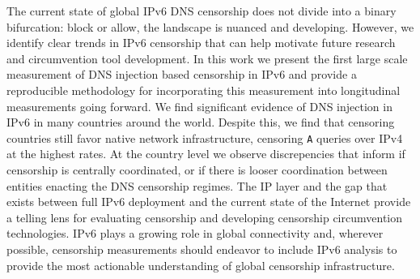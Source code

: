 The current state of global IPv6 DNS censorship does not divide into a binary
bifurcation: block or allow, the landscape is nuanced and developing. However, we
identify clear trends in IPv6 censorship that can help motivate future research
and circumvention tool development.
%
In this work we present the first large scale measurement of DNS injection based
censorship in IPv6 and provide a reproducible methodology for incorporating this
measurement into longitudinal measurements going forward. We find significant
evidence of DNS injection in IPv6 in many countries around the world. Despite
this, we find that censoring countries still favor native network
infrastructure, censoring \texttt{A} queries over IPv4 at the highest rates. At
the country level
we observe discrepencies that inform if censorship is centrally coordinated,
or if there is looser coordination between
entities enacting the DNS censorship regimes.
%
The IP layer and the gap that exists between full IPv6 deployment and the
current state of the Internet provide a telling lens for evaluating censorship
and developing censorship circumvention technologies. IPv6 plays a growing role
in global connectivity and, wherever possible, censorship measurements should
endeavor to include IPv6 analysis to provide the most actionable understanding
of global censorship infrastructure.
